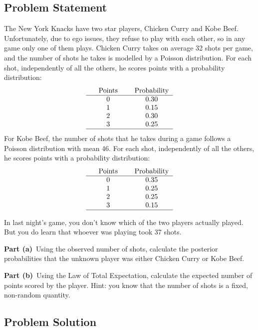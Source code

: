 \documentclass[12pt]{article}
\theoremstyle{definition}
\begin{document}
\subsection*{Problem Statement}

The New York Knacks have two star players, Chicken Curry and Kobe Beef. Unfortunately, due to ego issues, they refuse to play with each other, so in any game only one of them plays. Chicken Curry takes on average 32 shots per game, and the number of shots he takes is modelled by a Poisson distribution. For each shot, independently of all the others, he scores points with a probability distribution:
$$
\begin{tabular}{ccccc}
& Points & & Probability\\
\hline
& 0 & & 0.30\\
& 1 & & 0.15\\
& 2 & & 0.30\\
& 3 & & 0.25\\
\hline
\end{tabular}
$$
For Kobe Beef, the number of shots that he takes during a game follows a Poisson distribution with mean 46. For each shot, independently of all the others, he scores points with a probability distribution:
$$
\begin{tabular}{ccccc}
& Points & & Probability\\
\hline
& 0 & & 0.35\\
& 1 & & 0.25\\
& 2 & & 0.25\\
& 3 & & 0.15\\
\hline
\end{tabular}
$$

\bigskip
In last night's game, you don't know which of the two players actually played. But you do learn that whoever was playing took 37 shots. 

\bigskip
\noindent
{\bf Part (a)}\ Using the observed number of shots, calculate the posterior probabilities that the unknown player was either Chicken Curry or Kobe Beef.

\bigskip
\noindent
{\bf Part (b)}\ Using the Law of Total Expectation, calculate the expected number of points scored by the player. Hint: you know that the number of shots is a fixed, non-random quantity.

\newpage
\subsection*{Problem Solution}
\end{document}
